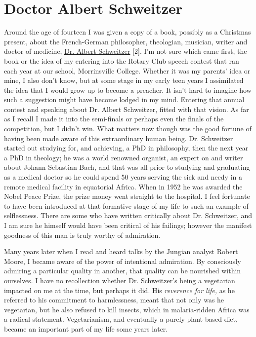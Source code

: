 \chapter{Doctor Albert Schweitzer}

Around the age of fourteen I was given a copy of a book, possibly as a
Christmas present, about the French-German philosopher, theologian,
musician, writer and doctor of medicine,
\underline{\href{https://www.britannica.com/biography/Albert-Schweitzer}{Dr.
Albert Schweitze}r} {[}2{]}. I'm not sure which came first, the book or
the idea of my entering into the Rotary Club speech contest that ran
each year at our school, Morrinsville College. Whether it was my
parents' idea or mine, I also don't know, but at some stage in my early
teen years I assimilated the idea that I would grow up to become a
preacher. It isn't hard to imagine how such a suggestion might have
become lodged in my mind. Entering that annual contest and speaking
about Dr. Albert Schweitzer, fitted with that vision. As far as I recall
I made it into the semi-finals or perhaps even the finals of the
competition, but I didn't win. What matters now though was the good
fortune of having been made aware of this extraordinary human being. Dr.
Schweitzer started out studying for, and achieving, a PhD in philosophy,
then the next year a PhD in theology; he was a world renowned organist,
an expert on and writer about Johann Sebastian Bach, and that was all
prior to studying and graduating as a medical doctor so he could spend
50 years serving the sick and needy in a remote medical facility in
equatorial Africa. When in 1952 he was awarded the Nobel Peace Prize,
the prize money went straight to the hospital. I feel fortunate to have
been introduced at that formative stage of my life to such an example of
selflessness. There are some who have written critically about Dr.
Schweitzer, and I am sure he himself would have been critical of his
failings; however the manifest goodness of this man is truly worthy of
admiration.

Many years later when I read and heard talks by the Jungian analyst
Robert Moore, I became aware of the power of intentional admiration. By
consciously admiring a particular quality in another, that quality can
be nourished within ourselves. I have no recollection whether Dr.
Schweitzer's being a vegetarian impacted on me at the time, but perhaps
it did. His \emph{reverence for life,} as he referred to his commitment
to harmlessness, meant that not only was he vegetarian, but he also
refused to kill insects, which in malaria-ridden Africa was a radical
statement. Vegetarianism, and eventually a purely plant-based diet,
became an important part of my life some years later.

